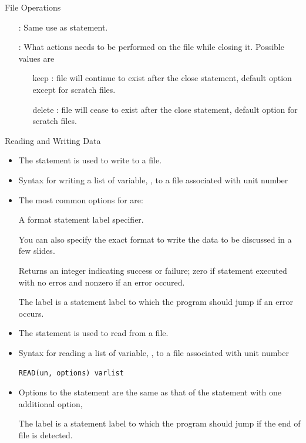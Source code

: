 \documentclass[10pt,t]{beamer}
\begin{document}
\begin{frame}{File Operations}
\begin{itemize}
    \item[] : Same use as  statement.
    \item[] : What actions needs to be performed on the file while closing it. Possible values are
      \begin{itemize}
        \item[keep]: file will continue to exist after the close statement, default option except for scratch files.
        \item[delete]: file will cease to exist after the close statement, default option for scratch files.
      \end{itemize}
  \end{itemize}
\end{frame}

\begin{frame}{Reading and Writing Data}
  \begin{itemize}
    \item The  statement is used to write to a file.
    \item Syntax for writing a list of variable, , to a file associated with unit number  
    \item[] 
    \item The most common options for  are:
    \item[]  A format statement label specifier.
    \item[] You can also specify the exact format to write the data to be discussed in a few slides.
    \item[]  Returns an integer indicating success or failure; zero if statement executed with no erros and nonzero if an error occured.
    \item[]  The label is a statement label to which the program should jump if an error occurs.
      \framebreak
    \item The  statement is used to read from a file.
    \item Syntax for reading a list of variable, , to a file associated with unit number 
    \item[] \lstinline[language={[90]Fortran}]|READ(un, options) varlist|
    \item Options to the  statement are the same as that of the  statement with one additional option,
    \item[]  The label is a statement label to which the program should jump if the end of file is detected.
  \end{itemize}
\end{frame}
\end{document}
